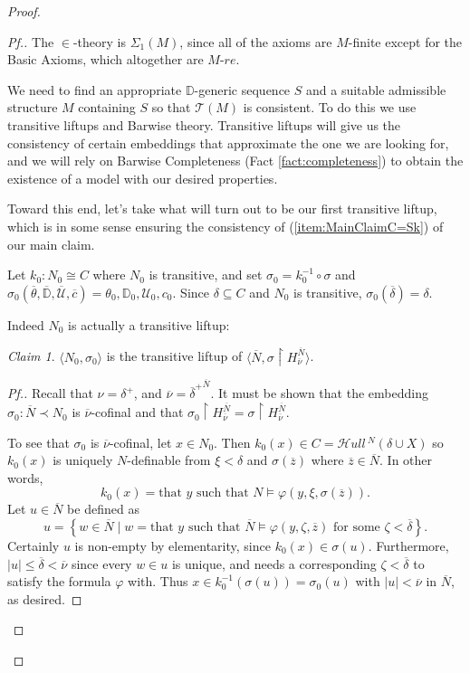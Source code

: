 \documentclass{amsart}
\theoremstyle{definition}
\theoremstyle{remark}
\newtheorem{claimno}{Claim}
\newcommand{\D}{\mathbb{D}}
\newcommand{\N}{{\overline{N}}}
\newcommand{\U}{\mathcal{U}}
\newcommand{\st}{\; | \;}
\newcommand{\set}[2]{\left\{#1\st #2 \right\}}
\newcommand{\SH}{\mathcal{H}\textit{ull} \,}
\newcommand{\Sk}[3]{\SH^{#1}( {#2} \cup {#3} ) }
\begin{document}
\begin{proof}
\begin{proof}[Pf.]
The $\in$-theory is $\Sigma_1(M)$, since all of the axioms are $M$-finite except for the \textsf{Basic Axioms}, which altogether are $M$-$re$.

We need to find an appropriate $\D$-generic sequence $S$ and a suitable admissible structure $M$ containing $S$ so that $\mathcal T(M)$ is consistent. To do this we use transitive liftups and Barwise theory. Transitive liftups will give us the consistency of certain embeddings that approximate the one we are looking for, and we will rely on Barwise Completeness (Fact \ref{fact:completeness}) to obtain the existence of a model with our desired properties. 

Toward this end, let's take what will turn out to be our first transitive liftup, which is in some sense ensuring the consistency of (\ref{item:MainClaimC=Sk}) of our main claim.

Let $k_0 : N_0 \cong C$ where $N_0$ is transitive, and set $\sigma_0 = k_0^{-1} \circ \sigma$ and $\sigma_0(\overline \theta, \overline{\D}, \overline{\U}, \overline c) = \theta_0, \D_0, \U_0, c_0.$
Since $\delta \subseteq C$ and $N_0$ is transitive, $\sigma_0(\overline \delta)=\delta$. 

Indeed $N_0$ is actually a transitive liftup:

\begin{claimno} $\langle N_0, \sigma_0 \rangle$ is the transitive liftup of $\langle \N, \sigma \upharpoonright H_{\overline \nu}^{\N} \rangle$. \end{claimno}
\begin{proof}[Pf.] Recall that $\nu=\delta^+$, and $\overline \nu={\overline \delta^+}^{\N}$. It must be shown that the embedding $\sigma_0: \overline N \prec N_0$ is $\overline \nu$-cofinal and that $\sigma_0 \upharpoonright H_{\overline \nu}^{\N}=\sigma \upharpoonright H_{\overline \nu}^{\overline N}$. 

To see that $\sigma_0$ is $\overline \nu$-cofinal, let $x \in N_0$. Then $k_0(x) \in C = \Sk{N}{\delta}{X}$ so $k_0(x)$ is uniquely $N$-definable from $\xi < \delta$ and $\sigma(\overline z)$ where $\overline z \in \N$. In other words, $$k_0(x) = \text{that } y \text{ such that } N \models \varphi(y, \xi, \sigma(\overline z)).$$ Let $u \in \N$ be defined as 
	$$u=\set{ w \in \N }{  w=\text{that } y \text{ such that } \N \models \varphi(y, \zeta, \overline z) \text{ for some } \zeta < \overline \delta }.$$
Certainly $u$ is non-empty by elementarity, since $k_0(x) \in \sigma(u).$
Furthermore, $|u| \leq \overline \delta < \overline \nu$ since every $w \in u$ is unique, and needs a corresponding $\zeta<\overline \delta$ to satisfy the formula $\varphi$ with.
Thus $x \in k_0^{-1}(\sigma(u))=\sigma_0(u)$ with $|u| < \overline \nu$ in $\N$, as desired. 


\end{proof}
\end{proof}
\end{proof}
\end{document}
